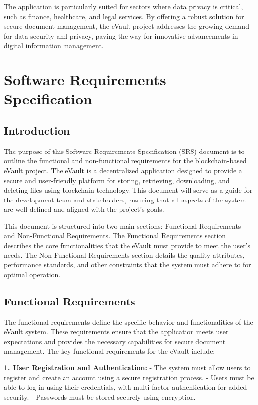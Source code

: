 \documentclass[12pt,a4paper]{report}
\begin{document}
The application is particularly suited for sectors where data privacy is critical, such as finance, healthcare, and legal services. By offering a robust solution for secure document management, the eVault project addresses the growing demand for data security and privacy, paving the way for innovative advancements in digital information management.


\chapter{Software Requirements Specification}

\section{Introduction}

The purpose of this Software Requirements Specification (SRS) document is to outline the functional and non-functional requirements for the blockchain-based eVault project. The eVault is a decentralized application designed to provide a secure and user-friendly platform for storing, retrieving, downloading, and deleting files using blockchain technology. This document will serve as a guide for the development team and stakeholders, ensuring that all aspects of the system are well-defined and aligned with the project's goals.

This document is structured into two main sections: Functional Requirements and Non-Functional Requirements. The Functional Requirements section describes the core functionalities that the eVault must provide to meet the user's needs. The Non-Functional Requirements section details the quality attributes, performance standards, and other constraints that the system must adhere to for optimal operation.

\section{Functional Requirements}

The functional requirements define the specific behavior and functionalities of the eVault system. These requirements ensure that the application meets user expectations and provides the necessary capabilities for secure document management. The key functional requirements for the eVault include:

\textbf{1. User Registration and Authentication:}
   - The system must allow users to register and create an account using a secure registration process.
   - Users must be able to log in using their credentials, with multi-factor authentication for added security.
   - Passwords must be stored securely using encryption.
\end{document}
